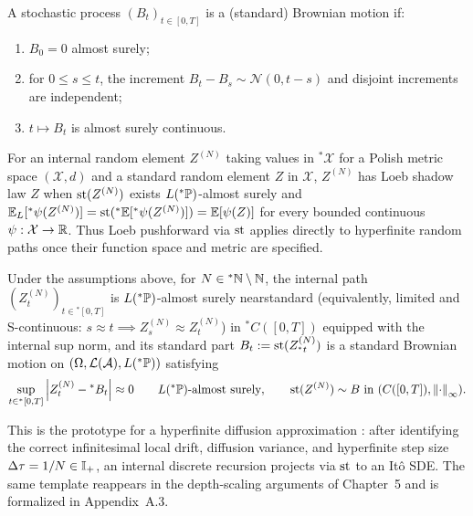 \begin{definition}\label{def:1.1}
A stochastic process $(B_t)_{t\in[0,T]}$ is a (standard) Brownian motion if:
\begin{enumerate}
\item $B_0 = 0$ almost surely;
\item for $0 \le s \le t$, the increment $B_t - B_s \sim \mathcal{N}(0, t-s)$ and disjoint increments are independent;
\item $t \mapsto B_t$ is almost surely continuous.
\end{enumerate}
\end{definition}

For an internal random element $Z^{(N)}$ taking values in ${}^*\mathcal{X}$ for a Polish metric space $(\mathcal{X}, d)$ and a standard random element $Z$ in $\mathcal{X}$, $Z^{(N)}$ has Loeb shadow law $Z$ when $\operatorname{st}(Z^{(N)})$ exists $L({}^*\mathbb{P})$-almost surely and $\mathbb{E}_L[{}^*\psi(Z^{(N)})] = \operatorname{st}({}^*\mathbb{E}[{}^*\psi(Z^{(N)})]) = \mathbb{E}[\psi(Z)]$ for every bounded continuous $\psi : \mathcal{X} \to \mathbb{R}$. Thus Loeb pushforward via $\operatorname{st}$ applies directly to hyperfinite random paths once their function space and metric are specified.

\begin{theorem}\label{thm:1.2}
Under the assumptions above, for $N \in {}^*\mathbb{N} \setminus \mathbb{N}$, the internal path $(Z_t^{(N)})_{t\in{}^*[0,T]}$ is $L({}^*\mathbb{P})$-almost surely nearstandard (equivalently, limited and S-continuous: $s \approx t \implies Z_s^{(N)} \approx Z_t^{(N)}$) in ${}^*C([0,T])$ equipped with the internal sup norm, and its standard part $B_t := \operatorname{st}(Z_{{}^*t}^{(N)})$ is a standard Brownian motion on $(\Omega, \mathcal{L}(\mathcal{A}), L({}^*\mathbb{P}))$ satisfying
\begin{equation}\label{eq:1.5}
\sup_{t \in {}^*[0, T]} \left\lvert Z_t^{(N)} - {}^*B_t \right\rvert \approx 0 \qquad L({}^*\mathbb{P})\text{-almost surely}, \qquad \operatorname{st}(Z^{(N)}) \sim B \text{ in } (C([0,T]), \left\lVert \cdot \right\rVert_\infty).
\end{equation}
\end{theorem}

\begin{remark}\label{rem:1.3}
This is the prototype for a hyperfinite diffusion approximation \cite{keisler1984infinitesimal,lindstrom1988invitation}: after identifying the correct infinitesimal local drift, diffusion variance, and hyperfinite step size $\Delta\tau = 1/N \in \mathbb{I}_+$, an internal discrete recursion projects via $\operatorname{st}$ to an It\^o SDE. The same template reappears in the depth-scaling arguments of Chapter~5 and is formalized in Appendix~A.3.
\end{remark}

